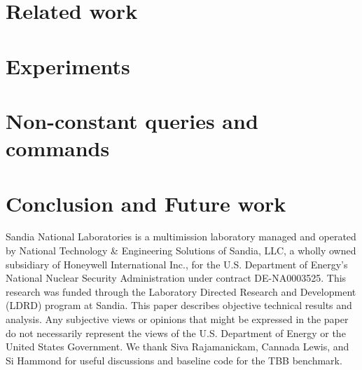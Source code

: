 \section{Related work}\label{sec:related-work}


\section{Experiments} \label{sec:experiments}

\section{Non-constant queries and commands} \label{sec:non-constant}

\section{Conclusion and Future work}



\begin{acknowledgements}
Sandia National Laboratories is a multimission laboratory managed and operated by National Technology \& Engineering Solutions of Sandia, LLC, a wholly owned subsidiary of Honeywell International Inc., for the U.S. Department of Energy’s National Nuclear Security Administration under contract DE-NA0003525.
This research was funded through the Laboratory Directed Research and Development (LDRD) program at Sandia.
This paper describes objective technical results and analysis. Any subjective views or opinions that might be expressed in the paper do not necessarily represent the views of the U.S. Department of Energy or the United States Government.
We thank Siva Rajamanickam, Cannada Lewis, and Si Hammond for useful
discussions and baseline code for the TBB benchmark.
\end{acknowledgements}


%
%







